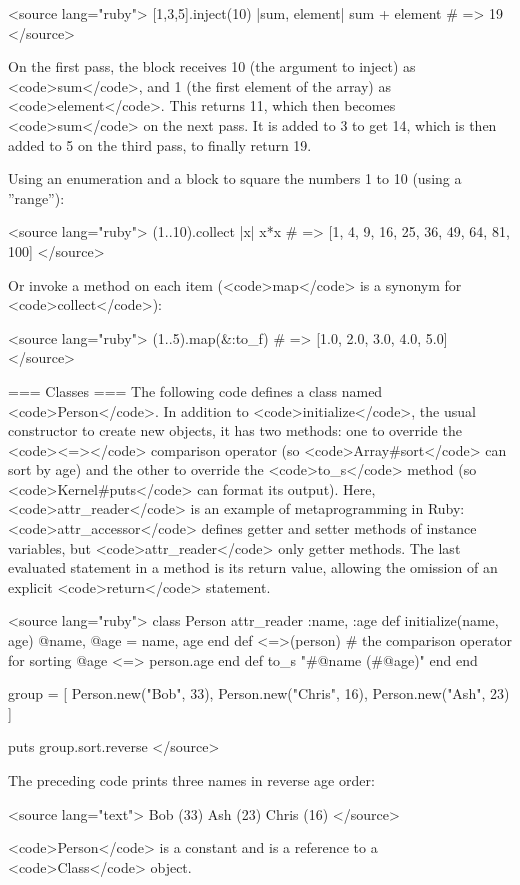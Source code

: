 <source lang="ruby">
[1,3,5].inject(10) {|sum, element| sum + element}   # => 19
</source>

On the first pass, the block receives 10 (the argument to inject) as <code>sum</code>, and 1 (the first element of the array) as <code>element</code>. This returns 11, which then becomes <code>sum</code> on the next pass.  It is added to 3 to get 14, which is then added to 5 on the third pass, to finally return 19.

Using an enumeration and a block to square the numbers 1 to 10 (using a ''range''):

<source lang="ruby">
(1..10).collect {|x| x*x}  # => [1, 4, 9, 16, 25, 36, 49, 64, 81, 100]
</source>

Or invoke a method on each item (<code>map</code> is a synonym for <code>collect</code>):

<source lang="ruby">
(1..5).map(&:to_f)  # => [1.0, 2.0, 3.0, 4.0, 5.0]
</source>

=== Classes ===
The following code defines a class named <code>Person</code>. In addition to <code>initialize</code>, the usual constructor to create new objects, it has two methods: one to override the <code><=></code> comparison operator (so <code>Array#sort</code> can sort by age) and the other to override the <code>to_s</code> method (so <code>Kernel#puts</code> can format its output). Here, <code>attr_reader</code> is an example of metaprogramming in Ruby: <code>attr_accessor</code> defines getter and setter methods of instance variables, but <code>attr_reader</code> only getter methods. The last evaluated statement in a method is its return value, allowing the omission of an explicit <code>return</code> statement.

<source lang="ruby">
class Person
  attr_reader :name, :age
  def initialize(name, age)
    @name, @age = name, age
  end
  def <=>(person) # the comparison operator for sorting
    @age <=> person.age
  end
  def to_s
    "#{@name} (#{@age})"
  end
end

group = [
  Person.new("Bob", 33),
  Person.new("Chris", 16),
  Person.new("Ash", 23)
]

puts group.sort.reverse
</source>

The preceding code prints three names in reverse age order:

<source lang="text">
Bob (33)
Ash (23)
Chris (16)
</source>

<code>Person</code> is a constant and is a reference to a <code>Class</code> object.


